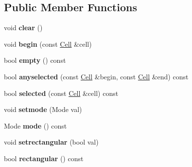 \subsection*{Public Member Functions}
\begin{DoxyCompactItemize}
\item 
\mbox{\label{classSelection_a42c62cee4f889ef466446b408054ea19}} 
void {\bfseries clear} ()
\item 
\mbox{\label{classSelection_ab6ac1d22722f7b5377c10f0d718f8028}} 
void {\bfseries begin} (const \mbox{\hyperlink{structCell}{Cell}} \&cell)
\item 
\mbox{\label{classSelection_acc50ca3fd1ef37445289c0e32469f0df}} 
bool {\bfseries empty} () const
\item 
\mbox{\label{classSelection_a0a390b689677ff57db5fbc2a21943633}} 
bool {\bfseries anyselected} (const \mbox{\hyperlink{structCell}{Cell}} \&begin, const \mbox{\hyperlink{structCell}{Cell}} \&end) const
\item 
\mbox{\label{classSelection_a4fefd6823bdc83bb386c82e8d9d7ea0c}} 
bool {\bfseries selected} (const \mbox{\hyperlink{structCell}{Cell}} \&cell) const
\item 
\mbox{\label{classSelection_aa3e288fa865fb2910719ea0b38654431}} 
void {\bfseries setmode} (Mode val)
\item 
\mbox{\label{classSelection_ad306139af35884d6124bd5d512ff00c4}} 
Mode {\bfseries mode} () const
\item 
\mbox{\label{classSelection_ac3cbf0adc8033159bd34bddfc318d37e}} 
void {\bfseries setrectangular} (bool val)
\item 
\mbox{\label{classSelection_a997fee19ae5c858534a9e55573aa75a7}} 
bool {\bfseries rectangular} () const
\end{DoxyCompactItemize}

